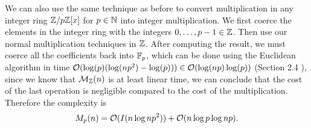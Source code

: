We can also use the same technique as before to convert multiplication in any integer ring ${\mathbb Z}/p{\mathbb Z}[x]$ for $p \in {\mathbb N}$ into integer multiplication. We first coerce the elements in the integer ring with the integers $0,\ldots, p-1 \in {\mathbb Z}$. Then use our normal multiplication techniques in ${\mathbb Z}$. After computing the result, we must coerce all the coefficients back into ${\mathbb F}_p$, which can be done using the Euclidean algorithm in time $\mathcal O(\log(p)(\log(np^2) - \log (p))) \in \mathcal O(\log (np)\log (p))$ (Section 2.4 \cite{modern-comp-alg}), since we know that $\mathcal M_{\mathbb Z}(n)$ is at least linear time, we can conclude that the cost of the last operation is negligible compared to the cost of the multiplication. Therefore the complexity is
\[
    M_p(n) = \mathcal O(I(n \log np^2)) + \mathcal O(n \log p \log np).
\]
